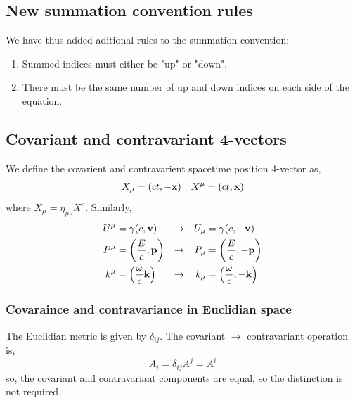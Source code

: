 \documentclass{book}
\begin{document}
\subsection{New summation convention rules}
We have thus added aditional rules to the summation convention:
\begin{enumerate}
	\item Summed indices must either be "up" or "down",
	\item There must be the same number of up and down indices on each side of the equation.
\end{enumerate}
\subsection{Covariant and contravariant 4-vectors}
We define the covarient and contravarient spacetime position 4-vector as,
\begin{align}
	X_\mu = (ct, -\vb{x}) && X^{\mu} = (ct, \vb{x})
\end{align}
where $X_\mu = \eta_{\mu\nu}X^{\nu}$. Similarly,
\begin{align}
	U^{\mu} & = \gamma(c, \vb{v})  &\to&&  U_{\mu} &= \gamma(c, -\vb{v}) \\
	P^{\mu} & = \left(\frac{E}{c}, \vb{p}\right) &\to&& P_{\mu}&=\left(\frac{E}{c}, -\vb{p}\right) \\
	k^{\mu}&=\left(\frac{\omega}{c}\vb{k}\right) &\to&& k_{\mu}&=\left(\frac{\omega}{c}, -\vb{k}\right)
\end{align}
\subsubsection{Covaraince and contravariance in Euclidian space}
The Euclidian metric is given by $\delta_{ij}$. The covariant $\to$ contravariant operation is,
\begin{equation}
	A_i = \delta_{ij}A^{j} = A^{i}
\end{equation}
so, the covariant and contravariant components are equal, so the distinction is not required.
\end{document}
